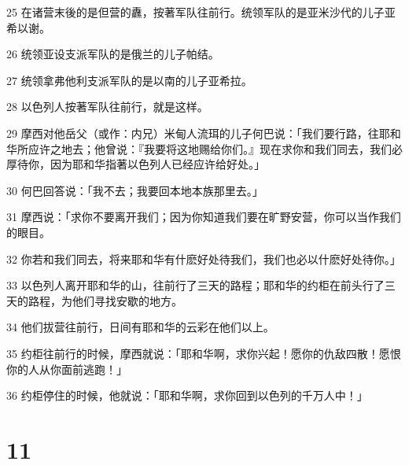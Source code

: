 \par 25 在诸营末後的是但营的纛，按著军队往前行。统领军队的是亚米沙代的儿子亚希以谢。
\par 26 统领亚设支派军队的是俄兰的儿子帕结。
\par 27 统领拿弗他利支派军队的是以南的儿子亚希拉。
\par 28 以色列人按著军队往前行，就是这样。
\par 29 摩西对他岳父（或作：内兄）米甸人流珥的儿子何巴说：「我们要行路，往耶和华所应许之地去；他曾说：『我要将这地赐给你们。』现在求你和我们同去，我们必厚待你，因为耶和华指著以色列人已经应许给好处。」
\par 30 何巴回答说：「我不去；我要回本地本族那里去。」
\par 31 摩西说：「求你不要离开我们；因为你知道我们要在旷野安营，你可以当作我们的眼目。
\par 32 你若和我们同去，将来耶和华有什麽好处待我们，我们也必以什麽好处待你。」
\par 33 以色列人离开耶和华的山，往前行了三天的路程；耶和华的约柜在前头行了三天的路程，为他们寻找安歇的地方。
\par 34 他们拔营往前行，日间有耶和华的云彩在他们以上。
\par 35 约柜往前行的时候，摩西就说：「耶和华啊，求你兴起！愿你的仇敌四散！愿恨你的人从你面前逃跑！」
\par 36 约柜停住的时候，他就说：「耶和华啊，求你回到以色列的千万人中！」

\chapter{11}

